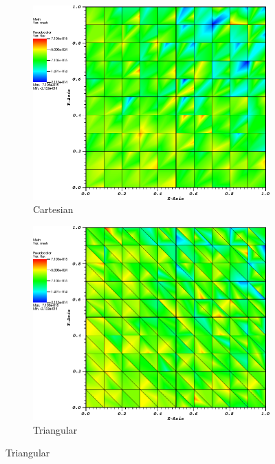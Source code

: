 \begin{figure}
\centering
{
	\begin{subfigure}[b]{0.465\textwidth}
		\centering
		\label{subfig::cart_me_k2_lin_sol}
		\includegraphics[width=\textwidth]{figures/sec_BF/quad_err_cart_PWL2.png}
		\caption{Cartesian}
	\end{subfigure}
	\hfill
	\begin{subfigure}[b]{0.465\textwidth}
		\centering
		\label{subfig::tri_me_k2_lin_sol}
		\includegraphics[width=\textwidth]{figures/sec_BF/quad_err_tri_PWL2.png}
		\caption{Triangular}

\end{subfigure}}
\end{figure}
